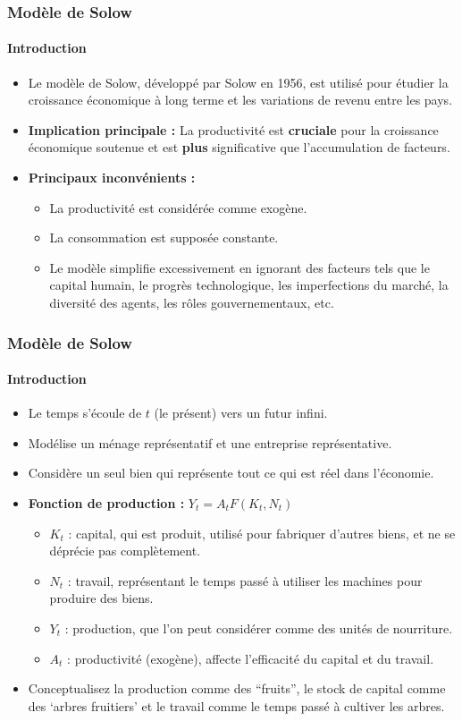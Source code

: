 \documentclass{beamer}
\begin{document}
\begin{frame}
    \frametitle{Modèle de Solow}
    \framesubtitle{Introduction}
    \begin{itemize}
        \item Le modèle de Solow, développé par Solow en 1956, est utilisé pour étudier la croissance économique à long terme et les variations de revenu entre les pays.\pause
        \item \textbf{Implication principale :} 
        La productivité est \textbf{cruciale} pour la croissance économique soutenue et est 
        \textbf{plus} significative que l'accumulation de facteurs.\pause
        \item \textbf{Principaux inconvénients :}
        \begin{itemize}
            \item La productivité est considérée comme exogène.
            \item La consommation est supposée constante.
            \item Le modèle simplifie excessivement en ignorant des facteurs tels que 
            le capital humain, le progrès technologique, les imperfections du marché, 
            la diversité des agents, les rôles gouvernementaux, etc.
        \end{itemize}
    \end{itemize}
\end{frame}

\begin{frame}
    \frametitle{Modèle de Solow}
    \framesubtitle{Introduction}
    \begin{itemize}
        \item Le temps s'écoule de \( t \) (le présent) vers un futur infini.
        \item Modélise un ménage représentatif et une entreprise représentative.
        \item Considère un seul bien qui représente tout ce qui est réel dans l'économie.\pause
        \item \textbf{Fonction de production :} \( Y_t = A_t F(K_t, N_t) \)
        \begin{itemize}
            \item \( K_t \) : capital, qui est produit, utilisé pour fabriquer d'autres biens, et ne se déprécie pas complètement.
            \item \( N_t \) : travail, représentant le temps passé à utiliser les machines pour produire des biens.
            \item \( Y_t \) : production, que l'on peut considérer comme des unités de nourriture.
            \item \( A_t \) : productivité (exogène), affecte l'efficacité du capital et du travail.
        \end{itemize}
        \pause
        \item 
        Conceptualisez la production comme des \enquote{fruits}, le stock de capital comme des \enquote*{arbres fruitiers} 
        et le travail comme le temps passé à cultiver les arbres.
    \end{itemize}
\end{frame}
\end{document}
